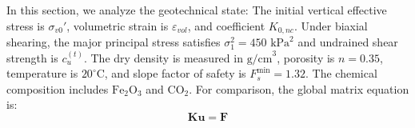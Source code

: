 ﻿\documentclass{article}
\begin{document}
In this section, we analyze the geotechnical state:
The initial vertical effective stress is $\sigma_{v0}'$, volumetric strain is $\varepsilon_{vol}$, and coefficient $K_{0,nc}$.
Under biaxial shearing, the major principal stress satisfies $\sigma_1^2 = 450\text{ kPa}^2$ and undrained shear strength is $c_u^{(t)}$.
The dry density is measured in $\text{g/cm}^3$, porosity is $n = 0.35$, temperature is $20^\circ\text{C}$, and slope factor of safety is $F_s^{\min} = 1.32$.
The chemical composition includes $\text{Fe}_2\text{O}_3$ and $\text{CO}_2$.
For comparison, the global matrix equation is:
\begin{equation}
\mathbf{K} \mathbf{u} = \mathbf{F}
\end{equation}
\end{document}
